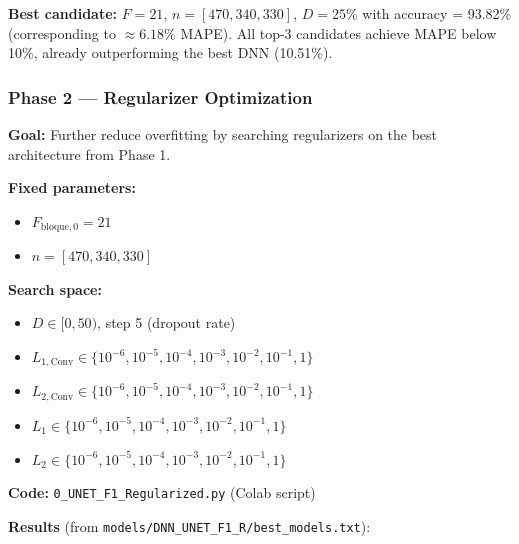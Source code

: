\documentclass[11pt,a4paper]{article}
\begin{document}
\textbf{Best candidate:} $F = 21$, $n = [470, 340, 330]$, $D = 25\%$ with accuracy = 93.82\% (corresponding to $\approx 6.18\%$ MAPE). All top-3 candidates achieve MAPE below 10\%, already outperforming the best DNN (10.51\%).

\subsubsection*{Phase 2 — Regularizer Optimization}

\textbf{Goal:} Further reduce overfitting by searching regularizers on the best architecture from Phase 1.

\textbf{Fixed parameters:}
\begin{itemize}
    \item $F_{\text{bloque},0} = 21$
    \item $n = [470, 340, 330]$
\end{itemize}

\textbf{Search space:}
\begin{itemize}
    \item $D \in [0, 50)$, step 5 (dropout rate)
    \item $L_{1,\text{Conv}} \in \{10^{-6}, 10^{-5}, 10^{-4}, 10^{-3}, 10^{-2}, 10^{-1}, 1\}$
    \item $L_{2,\text{Conv}} \in \{10^{-6}, 10^{-5}, 10^{-4}, 10^{-3}, 10^{-2}, 10^{-1}, 1\}$
    \item $L_1 \in \{10^{-6}, 10^{-5}, 10^{-4}, 10^{-3}, 10^{-2}, 10^{-1}, 1\}$
    \item $L_2 \in \{10^{-6}, 10^{-5}, 10^{-4}, 10^{-3}, 10^{-2}, 10^{-1}, 1\}$
\end{itemize}

\textbf{Code:} \texttt{0\_UNET\_F1\_Regularized.py} (Colab script)

\textbf{Results} (from \texttt{models/DNN\_UNET\_F1\_R/best\_models.txt}):
\end{document}
